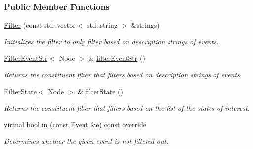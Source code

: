 \subsubsection*{Public Member Functions}
\begin{DoxyCompactItemize}
\item 
\hyperlink{structFilter_aae259d5697c5353713a5c7a821fdf36f}{Filter} (const std\+::vector$<$ std\+::string $>$ \&strings)\hypertarget{structFilter_aae259d5697c5353713a5c7a821fdf36f}{}\label{structFilter_aae259d5697c5353713a5c7a821fdf36f}

\begin{DoxyCompactList}\small\item\em Initializes the filter to only filter based on description strings of events. \end{DoxyCompactList}\item 
\hyperlink{structFilterEventStr}{Filter\+Event\+Str}$<$ Node $>$ \& \hyperlink{structFilter_a91acbd28d3318c3953460602233d9c98}{filter\+Event\+Str} ()
\begin{DoxyCompactList}\small\item\em Returns the constituent filter that filters based on description strings of events. \end{DoxyCompactList}\item 
\hyperlink{structFilterState}{Filter\+State}$<$ Node $>$ \& \hyperlink{structFilter_a97179b2192e4ec02f77021dbab531032}{filter\+State} ()
\begin{DoxyCompactList}\small\item\em Returns the constituent filter that filters based on the list of the states of interest. \end{DoxyCompactList}\item 
virtual bool \hyperlink{structFilter_a7c40b004854392a9d5dd1de657ede012}{in} (const \hyperlink{structFilterBase_a78af2a738ffab6c352d6c4ad0d148a01}{Event} \&e) const override
\begin{DoxyCompactList}\small\item\em Determines whether the given event is not filtered out. \end{DoxyCompactList}\end{DoxyCompactItemize}
